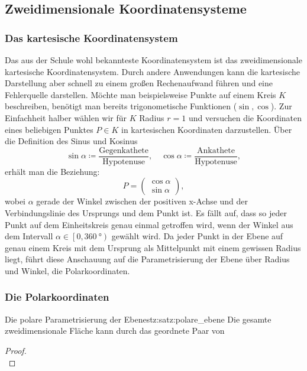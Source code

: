 \documentclass[12pt,a4paper]{report}
\begin{document}
	  \subsection{Zweidimensionale Koordinatensysteme}
		  \subsubsection{Das kartesische Koordinatensystem}\label{Mathe_KS_kartesisch}
			  Das aus der Schule wohl bekannteste Koordinatensystem ist das zweidimensionale kartesische Koordinatensystem.
			  Durch andere Anwendungen kann die kartesische Darstellung aber schnell zu einem großen Rechenaufwand führen und eine Fehlerquelle darstellen.
			  Möchte man beispielsweise Punkte auf einem Kreis \(K\) beschreiben, benötigt man bereits trigonometische Funktionen (\(\sin, \cos\)).
			  Zur Einfachheit halber wählen wir für \(K\) Radius \(r = 1\) und versuchen die Koordinaten eines beliebigen Punktes \(P \in K\) in kartesischen Koordinaten darzustellen.
			  Über die Definition des Sinus und Kosinus
			  \begin{equation*}
				  \sin \alpha \coloneq \frac{\text{Gegenkathete}}{\text{Hypotenuse}}, \quad \cos \alpha \coloneq \frac{\text{Ankathete}}{\text{Hypotenuse}},
			  \end{equation*}
			  erhält man die Beziehung:
			  \begin{equation*}
				  P = \begin{pmatrix}
					  \cos\alpha \\
					  \sin\alpha
				  \end{pmatrix},
			  \end{equation*}
			  wobei \(\alpha\) gerade der Winkel zwischen der positiven x-Achse und der Verbindungslinie des Ursprungs und dem Punkt ist.
			  Es fällt auf, dass so jeder Punkt auf dem Einheitskreis genau einmal getroffen wird, wenn der Winkel aus dem Intervall \(\alpha\in \left[ 0,\SI{360}{\degree}\right)\) gewählt wird.
			  Da jeder Punkt in der Ebene auf genau einem Kreis mit dem Ursprung als Mittelpunkt mit einem gewissen Radius liegt, führt diese Anschauung auf die Parametrisierung der Ebene über Radius und Winkel, die Polarkoordinaten.

		  \subsubsection{Die Polarkoordinaten}\label{Mathe_KS_polar}
			  \begin{satz}{Die polare Parametrisierung der Ebene}{stz:satz:polare_ebene}
				  Die gesamte zweidimensionale Fläche kann durch das geordnete Paar von
			  \end{satz}
			  \begin{proof}
				  \begin{equation*}
				  \end{equation*}
			  \end{proof}
\end{document}
